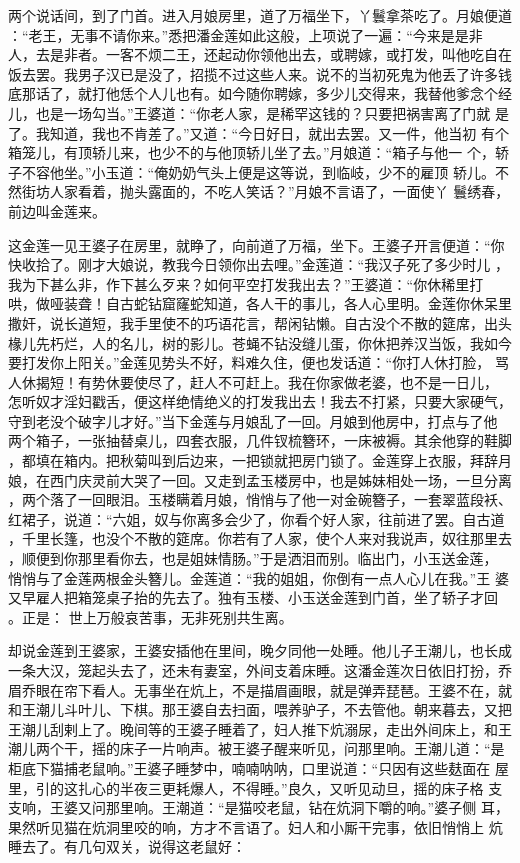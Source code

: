 两个说话间，到了门首。进入月娘房里，道了万福坐下，丫鬟拿茶吃了。月娘便道
：“老王，无事不请你来。”悉把潘金莲如此这般，上项说了一遍：“今来是是非
人，去是非者。一客不烦二王，还起动你领他出去，或聘嫁，或打发，叫他吃自在
饭去罢。我男子汉已是没了，招揽不过这些人来。说不的当初死鬼为他丢了许多钱
底那话了，就打他恁个人儿也有。如今随你聘嫁，多少儿交得来，我替他爹念个经
儿，也是一场勾当。”王婆道：“你老人家，是稀罕这钱的？只要把祸害离了门就
是了。我知道，我也不肯差了。”又道：“今日好日，就出去罢。又一件，他当初
有个箱笼儿，有顶轿儿来，也少不的与他顶轿儿坐了去。”月娘道：“箱子与他一
个，轿子不容他坐。”小玉道：“俺奶奶气头上便是这等说，到临岐，少不的雇顶
轿儿。不然街坊人家看着，抛头露面的，不吃人笑话？”月娘不言语了，一面使丫
鬟绣春，前边叫金莲来。

这金莲一见王婆子在房里，就睁了，向前道了万福，坐下。王婆子开言便道：“你
快收拾了。刚才大娘说，教我今日领你出去哩。”金莲道：“我汉子死了多少时儿
，我为下甚么非，作下甚么歹来？如何平空打发我出去？”王婆道：“你休稀里打
哄，做哑装聋！自古蛇钻窟窿蛇知道，各人干的事儿，各人心里明。金莲你休呆里
撒奸，说长道短，我手里使不的巧语花言，帮闲钻懒。自古没个不散的筵席，出头
椽儿先朽烂，人的名儿，树的影儿。苍蝇不钻没缝儿蛋，你休把养汉当饭，我如今
要打发你上阳关。”金莲见势头不好，料难久住，便也发话道：“你打人休打脸，
骂人休揭短！有势休要使尽了，赶人不可赶上。我在你家做老婆，也不是一日儿，
怎听奴才淫妇戳舌，便这样绝情绝义的打发我出去！我去不打紧，只要大家硬气，
守到老没个破字儿才好。”当下金莲与月娘乱了一回。月娘到他房中，打点与了他
两个箱子，一张抽替桌儿，四套衣服，几件钗梳簪环，一床被褥。其余他穿的鞋脚
，都填在箱内。把秋菊叫到后边来，一把锁就把房门锁了。金莲穿上衣服，拜辞月
娘，在西门庆灵前大哭了一回。又走到孟玉楼房中，也是姊妹相处一场，一旦分离
，两个落了一回眼泪。玉楼瞒着月娘，悄悄与了他一对金碗簪子，一套翠蓝段袄、
红裙子，说道：“六姐，奴与你离多会少了，你看个好人家，往前进了罢。自古道
，千里长篷，也没个不散的筵席。你若有了人家，使个人来对我说声，奴往那里去
，顺便到你那里看你去，也是姐妹情肠。”于是洒泪而别。临出门，小玉送金莲，
悄悄与了金莲两根金头簪儿。金莲道：“我的姐姐，你倒有一点人心儿在我。”王
婆又早雇人把箱笼桌子抬的先去了。独有玉楼、小玉送金莲到门首，坐了轿子才回
。正是：
世上万般哀苦事，无非死别共生离。

却说金莲到王婆家，王婆安插他在里间，晚夕同他一处睡。他儿子王潮儿，也长成
一条大汉，笼起头去了，还未有妻室，外间支着床睡。这潘金莲次日依旧打扮，乔
眉乔眼在帘下看人。无事坐在炕上，不是描眉画眼，就是弹弄琵琶。王婆不在，就
和王潮儿斗叶儿、下棋。那王婆自去扫面，喂养驴子，不去管他。朝来暮去，又把
王潮儿刮剌上了。晚间等的王婆子睡着了，妇人推下炕溺尿，走出外间床上，和王
潮儿两个干，摇的床子一片响声。被王婆子醒来听见，问那里响。王潮儿道：“是
柜底下猫捕老鼠响。”王婆子睡梦中，喃喃呐呐，口里说道：“只因有这些麸面在
屋里，引的这扎心的半夜三更耗爆人，不得睡。”良久，又听见动旦，摇的床子格
支支响，王婆又问那里响。王潮道：“是猫咬老鼠，钻在炕洞下嚼的响。”婆子侧
耳，果然听见猫在炕洞里咬的响，方才不言语了。妇人和小厮干完事，依旧悄悄上
炕睡去了。有几句双关，说得这老鼠好：

